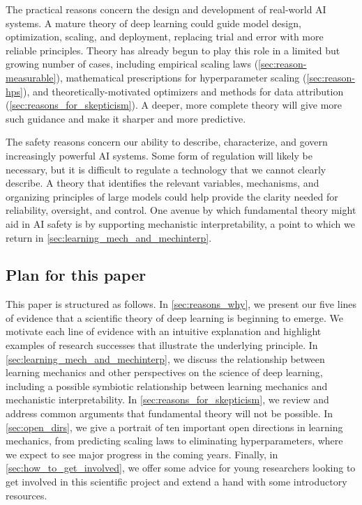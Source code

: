 The practical reasons concern the design and development of real-world AI systems.
A mature theory of deep learning could guide model design, optimization, scaling, and deployment, replacing trial and error with more reliable principles.
Theory has already begun to play this role in a limited but growing number of cases, including empirical scaling laws (\cref{sec:reason-measurable}), mathematical prescriptions for hyperparameter scaling (\cref{sec:reason-hps}), and theoretically-motivated optimizers and methods for data attribution (\cref{sec:reasons_for_skepticism}).
A deeper, more complete theory will give more such guidance and make it sharper and more predictive.

The safety reasons concern our ability to describe, characterize, and govern increasingly powerful AI systems.
Some form of regulation will likely be necessary, but it is difficult to regulate a technology that we cannot clearly describe.
A theory that identifies the relevant variables, mechanisms, and organizing principles of large models could help provide the clarity needed for reliability, oversight, and control.
One avenue by which fundamental theory might aid in AI safety is by supporting mechanistic interpretability, a point to which we return in \cref{sec:learning_mech_and_mechinterp}.


\subsection{Plan for this paper}

This paper is structured as follows.
In \cref{sec:reasons_why}, we present our five lines of evidence that a scientific theory of deep learning is beginning to emerge.
We motivate each line of evidence with an intuitive explanation and highlight examples of research successes that illustrate the underlying principle.
In \cref{sec:learning_mech_and_mechinterp}, we discuss the relationship between learning mechanics and other perspectives on the science of deep learning, including a possible symbiotic relationship between learning mechanics and mechanistic interpretability.
In \cref{sec:reasons_for_skepticism}, we review and address common arguments that fundamental theory will not be possible.
In \cref{sec:open_dirs}, we give a portrait of ten important open directions in learning mechanics, from predicting scaling laws to eliminating hyperparameters, where we expect to see major progress in the coming years.
Finally, in \cref{sec:how_to_get_involved}, we offer some advice for young researchers looking to get involved in this scientific project and extend a hand with some introductory resources.

